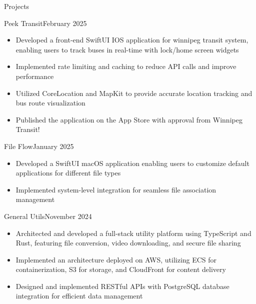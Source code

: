 \documentclass{article}
\newlength{\tabin}
\newlength{\secsep}
\newcommand{\lineunder}{\vspace*{-8pt} \\ \hspace*{-6pt} \hrulefill \\ \vspace*{-15pt}}
\newenvironment{tabbedsection}[1]{
    \begin{list}{}{
        \setlength{\itemsep}{0pt}
        \setlength{\labelsep}{0pt}
        \setlength{\labelwidth}{0pt}
        \setlength{\leftmargin}{\tabin}
        \setlength{\rightmargin}{\tabin}
        \setlength{\listparindent}{0pt}
        \setlength{\parsep}{0pt}
        \setlength{\parskip}{0pt}
        \setlength{\partopsep}{0pt}
        \setlength{\topsep}{#1}
    }
        \item[]
        }{
    \end{list}}
\newenvironment{resume_section}[1]{
    \vspace{2\secsep}
    \textsc{\large#1}
    \lineunder
    \begin{tabbedsection}{\secsep}
    }{\end{tabbedsection}}
\newenvironment{resume_subsection}[2]{
    \begin{minipage}[t]{0.75\linewidth}
        \textbf{#1}
    \end{minipage}%
    \begin{minipage}[t]{0.25\linewidth}
        \hfill \footnotesize #2
    \end{minipage}
    \begin{tabbedsection}{0.5\secsep}
    }{\end{tabbedsection}}
\newenvironment{subitems}{
    \renewcommand{\labelitemi}{-}
    \begin{itemize}
        \setlength{\labelsep}{1em}
        }{
    \end{itemize}}
\begin{document}
    \begin{resume_section}{Projects}
        \begin{resume_subsection}{Peek Transit}{February 2025}
            \begin{subitems}
                \item Developed a front-end SwiftUI IOS application for winnipeg transit system, enabling users to
                track buses in real-time with lock/home screen widgets
                \item Implemented rate limiting and caching to reduce API calls and improve performance
                \item Utilized CoreLocation and MapKit to provide accurate location tracking and bus route visualization
                \item Published the application on the App Store with approval from Winnipeg Transit!
            \end{subitems}
            
            
        \end{resume_subsection}
        
        \begin{resume_subsection}{File Flow}{January 2025}
            \begin{subitems}
                \item Developed a SwiftUI macOS application enabling users to customize default applications for different file types
                \item Implemented system-level integration for seamless file association management
            \end{subitems}
        \end{resume_subsection}

        \begin{resume_subsection}{General Utils}{November 2024}
            \begin{subitems}
                \item Architected and developed a full-stack utility platform using TypeScript and Rust, featuring file conversion, video downloading, and secure file sharing
                \item Implemented an architecture deployed on AWS, utilizing ECS for containerization, S3 for storage, and CloudFront for content delivery
                \item Designed and implemented RESTful APIs with PostgreSQL database integration for efficient data management
            \end{subitems}
        \end{resume_subsection}


\end{resume_section}
\end{document}
